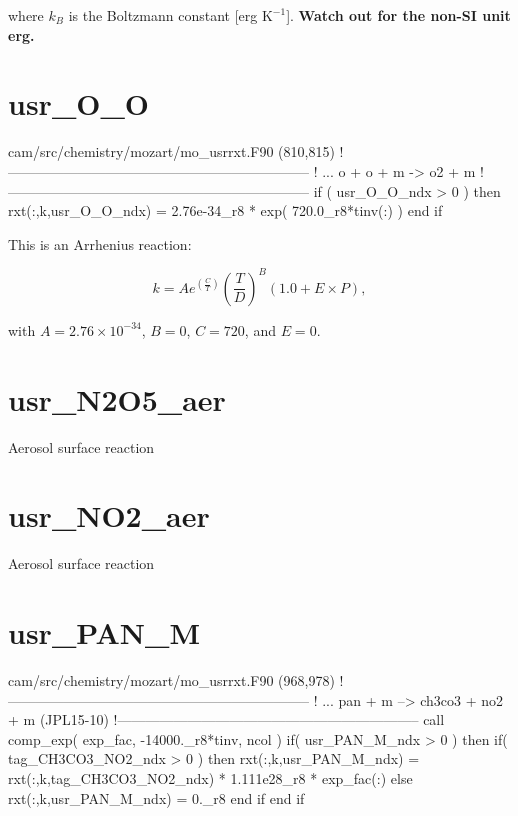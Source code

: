 \documentclass[titlepage]{article}
\begin{document}
\noindent where $k_B$ is the Boltzmann constant [erg $\mbox{K}^{-1}$]. \textbf{Watch out for the non-SI unit erg.}



\section{usr\_O\_O}

\begin{blockcode}[commandchars=\\\{\}]
\color{gray}cam/src/chemistry/mozart/mo_usrrxt.F90 (810,815)
!-----------------------------------------------------------------
! ... o + o + m -> o2 + m
!-----------------------------------------------------------------
       if ( usr_O_O_ndx > 0 ) then
          rxt(:,k,usr_O_O_ndx) = 2.76e-34_r8 * exp( 720.0_r8*tinv(:) )
       end if
\end{blockcode}

This is an Arrhenius reaction:

\begin{equation}
k = Ae^{(\frac{C}{T})}(\frac{T}{D})^B(1.0+E \times P),
\end{equation}

\noindent with $A = 2.76 \times 10^{-34}$, $B = 0$, $C = 720$, and $E = 0$.
 
 
          
\section{usr\_N2O5\_aer}

Aerosol surface reaction


\section{usr\_NO2\_aer}

Aerosol surface reaction


\section{usr\_PAN\_M}

\begin{blockcode}[commandchars=\\\{\}]
\color{gray}cam/src/chemistry/mozart/mo_usrrxt.F90 (968,978)
!-----------------------------------------------------------------
! ... pan + m --> ch3co3 + no2 + m (JPL15-10)
!-----------------------------------------------------------------
       call comp_exp( exp_fac, -14000._r8*tinv, ncol )
       if( usr_PAN_M_ndx > 0 ) then
          if( tag_CH3CO3_NO2_ndx > 0 ) then
             rxt(:,k,usr_PAN_M_ndx) = rxt(:,k,tag_CH3CO3_NO2_ndx) * 1.111e28_r8 * exp_fac(:)
          else
             rxt(:,k,usr_PAN_M_ndx) = 0._r8
          end if
       end if
\end{blockcode}
\end{document}
